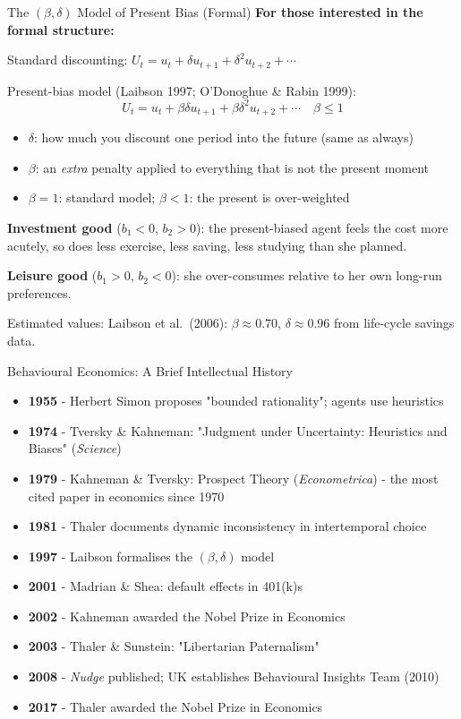 \documentclass[10pt]{beamer}
\begin{document}
\begin{frame}[allowframebreaks]{The $(\beta, \delta)$ Model of Present Bias (Formal)}
\textbf{For those interested in the formal structure:}


Standard discounting: $U_t = u_t + \delta u_{t+1} + \delta^2 u_{t+2} + \cdots$


Present-bias model (Laibson 1997; O'Donoghue \& Rabin 1999):
\[
U_t = u_t + \beta \delta u_{t+1} + \beta \delta^2 u_{t+2} + \cdots \quad \beta \leq 1
\]

\begin{itemize}
\item $\delta$: how much you discount one period into the future (same as always)
\item $\beta$: an \emph{extra} penalty applied to everything that is not the present moment
\item $\beta = 1$: standard model; $\beta < 1$: the present is over-weighted
\end{itemize}


\textbf{Investment good} ($b_1 < 0$, $b_2 > 0$): the present-biased agent feels the cost more acutely, so does less exercise, less saving, less studying than she planned.

\textbf{Leisure good} ($b_1 > 0$, $b_2 < 0$): she over-consumes relative to her own long-run preferences.


\alert{Estimated values:} Laibson et al.\ (2006): $\beta \approx 0.70$, $\delta \approx 0.96$ from life-cycle savings data.
\end{frame}


\begin{frame}{Behavioural Economics: A Brief Intellectual History}
\begin{itemize}
\item \textbf{1955} - Herbert Simon proposes "bounded rationality"; agents use heuristics
\item \textbf{1974} - Tversky \& Kahneman: "Judgment under Uncertainty: Heuristics and Biases" (\emph{Science})
\item \textbf{1979} - Kahneman \& Tversky: Prospect Theory (\emph{Econometrica}) - the most cited paper in economics since 1970
\item \textbf{1981} - Thaler documents dynamic inconsistency in intertemporal choice
\item \textbf{1997} - Laibson formalises the $(\beta, \delta)$ model
\item \textbf{2001} - Madrian \& Shea: default effects in 401(k)s
\item \textbf{2002} - Kahneman awarded the Nobel Prize in Economics
\item \textbf{2003} - Thaler \& Sunstein: "Libertarian Paternalism"
\item \textbf{2008} - \emph{Nudge} published; UK establishes Behavioural Insights Team (2010)
\item \textbf{2017} - Thaler awarded the Nobel Prize in Economics
\end{itemize}
\end{frame}
\end{document}
